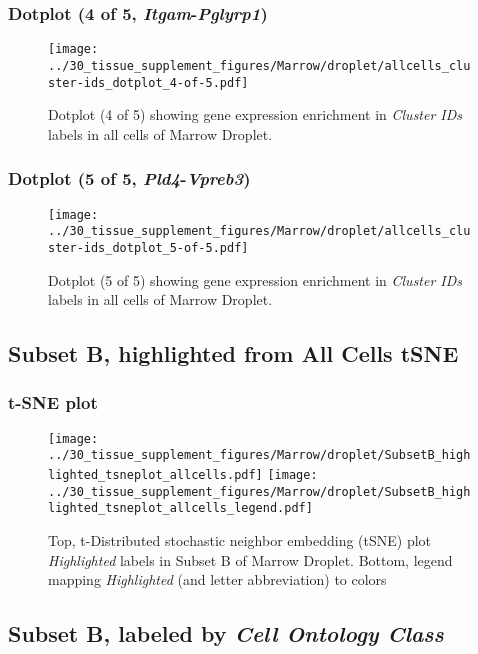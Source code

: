 \clearpage

\subsubsection{Dotplot (4 of 5, \emph{Itgam}-\emph{Pglyrp1})}
\begin{figure}[h]
\centering
\texttt{[image: ../30\_tissue\_supplement\_figures/Marrow/droplet/allcells\_cluster-ids\_dotplot\_4-of-5.pdf]}

\caption{ Dotplot (4 of 5)  showing gene expression enrichment in \emph{Cluster IDs} labels in all cells of Marrow Droplet. }
\end{figure}


\clearpage

\subsubsection{Dotplot (5 of 5, \emph{Pld4}-\emph{Vpreb3})}
\begin{figure}[h]
\centering
\texttt{[image: ../30\_tissue\_supplement\_figures/Marrow/droplet/allcells\_cluster-ids\_dotplot\_5-of-5.pdf]}

\caption{ Dotplot (5 of 5)  showing gene expression enrichment in \emph{Cluster IDs} labels in all cells of Marrow Droplet. }
\end{figure}


\clearpage
\subsection{Subset B, highlighted from All Cells tSNE}
\subsubsection{t-SNE plot}
\begin{figure}[h]
\centering
\texttt{[image: ../30\_tissue\_supplement\_figures/Marrow/droplet/SubsetB\_highlighted\_tsneplot\_allcells.pdf]}
\texttt{[image: ../30\_tissue\_supplement\_figures/Marrow/droplet/SubsetB\_highlighted\_tsneplot\_allcells\_legend.pdf]}
\caption{Top, t-Distributed stochastic neighbor embedding (tSNE) plot  \emph{Highlighted} labels in Subset B of Marrow Droplet. Bottom, legend mapping \emph{Highlighted} (and letter abbreviation) to colors}
\end{figure}


\clearpage

\subsection{Subset B, labeled by \emph{Cell Ontology Class}}

